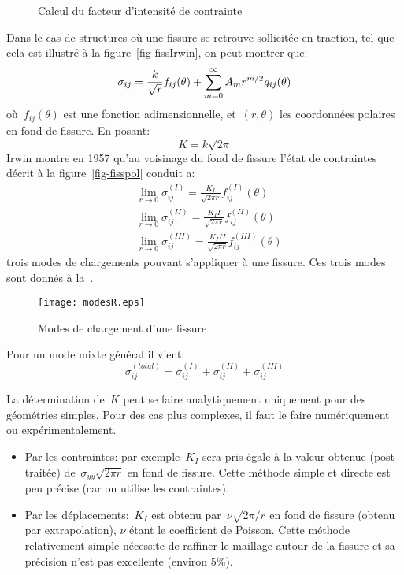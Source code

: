 \begin{figure}[ht]\centering
{}\hspace{6em}
\caption{Calcul du facteur d'intensité de contrainte}
\end{figure}
Dans le cas de structures où une fissure se retrouve sollicitée en traction, tel que cela est illustré à la figure~\ref{fig-fissIrwin}, on peut montrer que:
\begin{equation} \sigma_{ij} = \frac{k}{\sqrt{r}} f_{ij}(\theta) + \displaystyle\sum_{m=0}^\infty A_m r^{m/2} g_{ij}(\theta) \end{equation}
où~$f_{ij}(\theta)$ est une fonction adimensionnelle, et~$(r, \theta)$ les coordonnées polaires en fond de fissure. En posant:
\begin{equation} K = k\sqrt{2\pi} \end{equation}
Irwin montre en 1957 qu'au voisinage du fond de fissure l'état de contraintes décrit à la figure~\ref{fig-fisspol} conduit a:
\begin{align}
&\lim_{r\rightarrow0} \sigma_{ij}^{(I)} = \frac{K_I}{\sqrt{2\pi r}} f_{ij}^{(I)}(\theta) \\
&\lim_{r\rightarrow0} \sigma_{ij}^{(II)} = \frac{K_II}{\sqrt{2\pi r}} f_{ij}^{(II)}(\theta) \\
&\lim_{r\rightarrow0} \sigma_{ij}^{(III)} = \frac{K_III}{\sqrt{2\pi r}} f_{ij}^{(III)}(\theta)
\end{align}
trois modes de chargements pouvant s'appliquer à une fissure. Ces trois modes sont donnés à la~.
\begin{figure}[htb]
\centering\texttt{[image: modesR.eps]}
\caption{Modes de chargement d'une fissure}\label{fig-modesR}
\end{figure}

\medskip
Pour un mode mixte général il vient:
\begin{equation} \sigma_{ij}^{(total)} = \sigma_{ij}^{(I)} + \sigma_{ij}^{(II)} + \sigma_{ij}^{(III)} \end{equation}


\medskip{}
La détermination de~$K$ peut se faire analytiquement uniquement pour des géométries simples. Pour des cas plus complexes, il faut le faire numériquement ou expérimentalement.
\begin{itemize}
\item Par les contraintes: par exemple~$K_I$ sera pris égale à la valeur obtenue (post-traitée) de~$\sigma_{yy}\sqrt{2\pi r}$ en fond de fissure. Cette méthode simple et directe est peu précise (car on utilise les contraintes).
\item Par les déplacements:~$K_I$ est obtenu par~$\nu \sqrt{2\pi/r}$ en fond de fissure (obtenu par extrapolation), $\nu$ étant le coefficient de Poisson. Cette méthode relativement simple nécessite de raffiner le maillage autour de la fissure et sa précision n'est pas excellente (environ 5\%).
\end{itemize}

